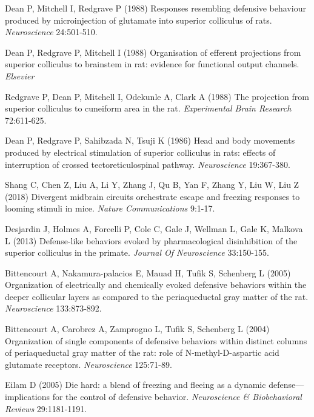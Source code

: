 \documentclass{ar-1col}
\begin{document}
{\begin{thebibliography}{00}
Dean P, Mitchell I, Redgrave P (1988) 
Responses resembling defensive behaviour produced by microinjection of glutamate into superior colliculus of rats.
\textit{ Neuroscience} 24:501-510.

Dean P, Redgrave P, Mitchell I (1988) 
Organisation of efferent projections from superior colliculus to brainstem in rat: evidence for functional output channels.
\textit{ Elsevier}

Redgrave P, Dean P, Mitchell I, Odekunle A, Clark A (1988) 
The projection from superior colliculus to cuneiform area in the rat.
\textit{ Experimental Brain Research} 72:611-625.

Dean P, Redgrave P, Sahibzada N, Tsuji K (1986) 
Head and body movements produced by electrical stimulation of superior colliculus in rats: effects of interruption of crossed tectoreticulospinal pathway.
\textit{ Neuroscience} 19:367-380.

Shang C, Chen Z, Liu A, Li Y, Zhang J, Qu B, Yan F, Zhang Y, Liu W, Liu Z (2018) 
Divergent midbrain circuits orchestrate escape and freezing responses to looming stimuli in mice.
\textit{ Nature Communications} 9:1-17.

Desjardin J, Holmes A, Forcelli P, Cole C, Gale J, Wellman L, Gale K, Malkova L (2013) 
Defense-like behaviors evoked by pharmacological disinhibition of the superior colliculus in the primate.
\textit{ Journal Of Neuroscience} 33:150-155.

Bittencourt A, Nakamura-palacios E, Mauad H, Tufik S, Schenberg L (2005) 
Organization of electrically and chemically evoked defensive behaviors within the deeper collicular layers as compared to the periaqueductal gray matter of the rat.
\textit{ Neuroscience} 133:873-892.

Bittencourt A, Carobrez A, Zamprogno L, Tufik S, Schenberg L (2004) 
Organization of single components of defensive behaviors within distinct columns of periaqueductal gray matter of the rat: role of N-methyl-D-aspartic acid glutamate receptors.
\textit{ Neuroscience} 125:71-89.

Eilam D (2005) 
Die hard: a blend of freezing and fleeing as a dynamic defense—implications for the control of defensive behavior.
\textit{ Neuroscience \& Biobehavioral Reviews} 29:1181-1191.


\end{thebibliography}}
\end{document}
